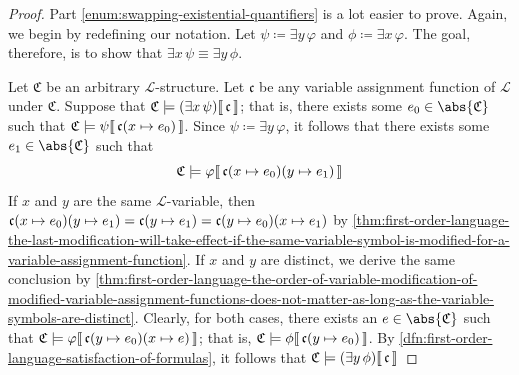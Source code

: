 \begin{proof}
    \vspace{0.3cm}
    \noindent
    Part \ref{enum:swapping-existential-quantifiers} is a lot easier to prove. Again, we begin by redefining our notation.
    Let \( \psi \coloneq \exists y \, \varphi \) and \( \phi \coloneq \exists x \, \varphi \).
    The goal, therefore, is to show that \( \exists x \, \psi \equiv \exists y \, \phi \).

    \vspace{0.3cm}
    \noindent
    Let \( \mathfrak{C} \) be an arbitrary \( \mathcal{L} \)-structure. Let \( \mathfrak{c} \) be any variable assignment function of \( \mathcal{L} \)
    under \( \mathfrak{C} \). Suppose that \( \folwffsatisfaction{\mathfrak{C}}{\mleft( \exists x \, \psi \mright)}{\mathfrak{c}} \);
    that is, there exists some \( e_{0} \in \abs{\mathfrak{C}} \) such that
    \( \folwffsatisfaction{\mathfrak{C}}{\psi}{ \folmodifiedvariableassignmentfunction{\mathfrak{c}}{x}{e_{0}}}\).
    Since \( \psi \coloneq \exists y \, \varphi \), it follows that there exists some \( e_{1} \in \abs{\mathfrak{C}} \) such that
    \begin{equation*}
        \folwffsatisfaction{\mathfrak{C}}{\varphi}{\folmodifiedvariableassignmentfunction{\folmodifiedvariableassignmentfunction{\mathfrak{c}}{x}{e_{0}}}{y}{e_{1}}}
    \end{equation*}
    If \( x \) and \( y \) are the same \( \mathcal{L} \)-variable, then
    \( \folmodifiedvariableassignmentfunction{ \folmodifiedvariableassignmentfunction{\mathfrak{c}}{x}{e_{0}} }{y}{e_{1}}
    = \folmodifiedvariableassignmentfunction{ \mathfrak{c} }{y}{e_{1}}
    = \folmodifiedvariableassignmentfunction{ \folmodifiedvariableassignmentfunction{\mathfrak{c}}{y}{e_{0}} }{x}{e_{1}} \)
    by \cref{thm:first-order-language-the-last-modification-will-take-effect-if-the-same-variable-symbol-is-modified-for-a-variable-assignment-function}.
    If \( x \) and \( y \) are distinct, we derive the same conclusion by
    \cref{thm:first-order-language-the-order-of-variable-modification-of-modified-variable-assignment-functions-does-not-matter-as-long-as-the-variable-symbols-are-distinct}.
    Clearly, for both cases, there exists an \( e \in \abs{\mathfrak{C}} \) such that
    \( \folwffsatisfaction{\mathfrak{C}}{\varphi}{ \folmodifiedvariableassignmentfunction{ \folmodifiedvariableassignmentfunction{\mathfrak{c}}{y}{e_{0}} }{x}{e} } \);
    that is, \( \folwffsatisfaction{\mathfrak{C}}{\phi}{ \folmodifiedvariableassignmentfunction{\mathfrak{c}}{y}{e_{0}} } \).
    By \cref{dfn:first-order-language-satisfaction-of-formulas}, it follows that \( \folwffsatisfaction{\mathfrak{C}}{\mleft( \exists y \, \phi \mright)}{\mathfrak{c}} \)

\end{proof}
